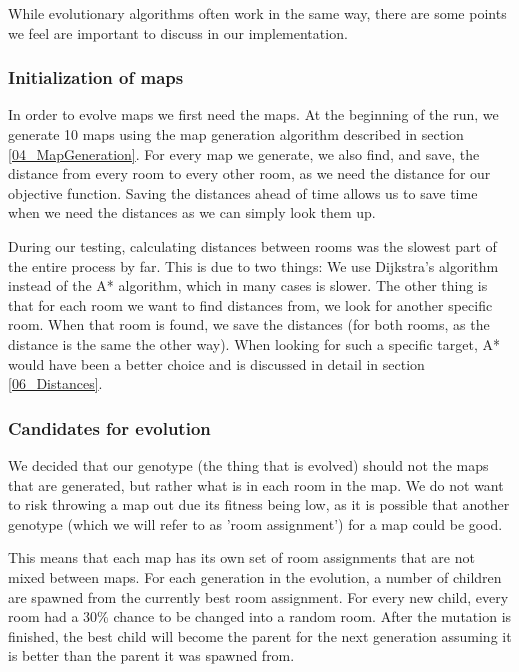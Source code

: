 While evolutionary algorithms often work in the same way, there are some points we feel are important to discuss in our implementation.

\subsubsection{Initialization of maps}
\label{04_Evolution_Initialization}

In order to evolve maps we first need the maps. At the beginning of the run, we generate 10 maps using the map generation algorithm described in section \ref{04_MapGeneration}. For every map we generate, we also find, and save, the distance from every room to every other room, as we need the distance for our objective function. Saving the distances ahead of time allows us to save time when we need the distances as we can simply look them up.

During our testing, calculating distances between rooms was the slowest part of the entire process by far. This is due to two things: We use Dijkstra's algorithm\cite{Dijkstra} instead of the A* algorithm\cite{AStar}, which in many cases is slower. The other thing is that for each room we want to find distances from, we look for another specific room. When that room is found, we save the distances (for both rooms, as the distance is the same the other way). When looking for such a specific target, A* would have been a better choice and is discussed in detail in section \ref{06_Distances}.

\subsubsection{Candidates for evolution}

We decided that our genotype (the thing that is evolved) should not the maps that are generated, but rather what is in each room in the map. We do not want to risk throwing a map out due its fitness being low, as it is possible that another genotype (which we will refer to as 'room assignment') for a map could be good.

This means that each map has its own set of room assignments that are not mixed between maps. For each generation in the evolution, a number of children are spawned from the currently best room assignment. For every new child, every room had a 30\% chance to be changed into a random room. After the mutation is finished, the best child will become the parent for the next generation assuming it is better than the parent it was spawned from.

